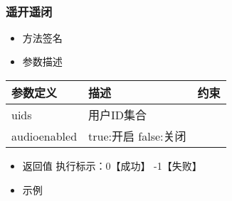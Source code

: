 \documentclass[letterpaper,10pt,english]{sphinxmanual}
\begin{document}
​


\subsubsection{遥开遥闭}
\label{\detokenize{csharp:id71}}\begin{itemize}
\item {} 
方法签名

\end{itemize}

%
\begin{sphinxVerbatim}[commandchars=\\\{\}]
  \PYG{p}{[}\PYG{p}{]}   
\end{sphinxVerbatim}
\begin{itemize}
\item {} 
参数描述

\end{itemize}


\begin{savenotes}\sphinxattablestart
\centering
\begin{tabulary}{\linewidth}[t]{|T|T|T|}
\hline
\sphinxstyletheadfamily 
参数定义
&\sphinxstyletheadfamily 
描述
&\sphinxstyletheadfamily 
约束
\\
\hline
uids
&
用户ID集合
&
\textendash{}
\\
\hline
audioenabled
&
true:开启 false:关闭
&
\textendash{}
\\
\hline
\end{tabulary}
\par
\sphinxattableend\end{savenotes}
\begin{itemize}
\item {} 
返回值 执行标示：0【成功】 -1【失败】

\item {} 
示例

\end{itemize}

%
\begin{sphinxVerbatim}[commandchars=\\\{\}]
   
   \PYG{p}{[}\PYG{p}{]}   
 
\end{sphinxVerbatim}
\end{document}
